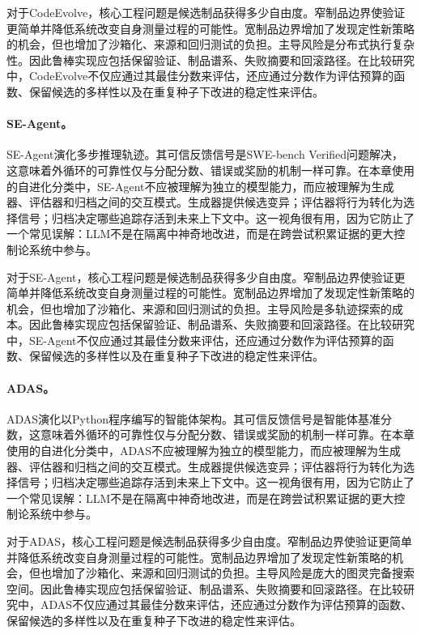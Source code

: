 对于CodeEvolve，核心工程问题是候选制品获得多少自由度。窄制品边界使验证更简单并降低系统改变自身测量过程的可能性。宽制品边界增加了发现定性新策略的机会，但也增加了沙箱化、来源和回归测试的负担。主导风险是分布式执行复杂性。因此鲁棒实现应包括保留验证、制品谱系、失败摘要和回滚路径。在比较研究中，CodeEvolve不仅应通过其最佳分数来评估，还应通过分数作为评估预算的函数、保留候选的多样性以及在重复种子下改进的稳定性来评估。

\paragraph{SE-Agent。} SE-Agent演化多步推理轨迹。其可信反馈信号是SWE-bench Verified问题解决，这意味着外循环的可靠性仅与分配分数、错误或奖励的机制一样可靠。在本章使用的自进化分类中，SE-Agent不应被理解为独立的模型能力，而应被理解为生成器、评估器和归档之间的交互模式。生成器提供候选变异；评估器将行为转化为选择信号；归档决定哪些追踪存活到未来上下文中。这一视角很有用，因为它防止了一个常见误解：LLM不是在隔离中神奇地改进，而是在跨尝试积累证据的更大控制论系统中参与。

对于SE-Agent，核心工程问题是候选制品获得多少自由度。窄制品边界使验证更简单并降低系统改变自身测量过程的可能性。宽制品边界增加了发现定性新策略的机会，但也增加了沙箱化、来源和回归测试的负担。主导风险是多轨迹探索的成本。因此鲁棒实现应包括保留验证、制品谱系、失败摘要和回滚路径。在比较研究中，SE-Agent不仅应通过其最佳分数来评估，还应通过分数作为评估预算的函数、保留候选的多样性以及在重复种子下改进的稳定性来评估。

\paragraph{ADAS。} ADAS演化以Python程序编写的智能体架构。其可信反馈信号是智能体基准分数，这意味着外循环的可靠性仅与分配分数、错误或奖励的机制一样可靠。在本章使用的自进化分类中，ADAS不应被理解为独立的模型能力，而应被理解为生成器、评估器和归档之间的交互模式。生成器提供候选变异；评估器将行为转化为选择信号；归档决定哪些追踪存活到未来上下文中。这一视角很有用，因为它防止了一个常见误解：LLM不是在隔离中神奇地改进，而是在跨尝试积累证据的更大控制论系统中参与。

对于ADAS，核心工程问题是候选制品获得多少自由度。窄制品边界使验证更简单并降低系统改变自身测量过程的可能性。宽制品边界增加了发现定性新策略的机会，但也增加了沙箱化、来源和回归测试的负担。主导风险是庞大的图灵完备搜索空间。因此鲁棒实现应包括保留验证、制品谱系、失败摘要和回滚路径。在比较研究中，ADAS不仅应通过其最佳分数来评估，还应通过分数作为评估预算的函数、保留候选的多样性以及在重复种子下改进的稳定性来评估。

